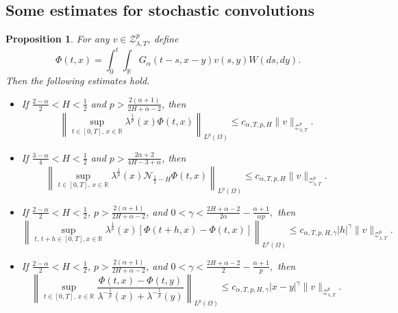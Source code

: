 \documentclass[11pt,reqno]{amsart}
\numberwithin{equation}{section}
\newtheorem{proposition}[theorem]{Proposition}
\newcommand{\1}{{\bf 1}}
\newcommand{\2}{{\bf 2}}
\begin{document}
\subsection{Some estimates for stochastic convolutions}

\begin{proposition}\label{prop 4.2}
For any $v\in \mathcal{Z}_{\lambda,T}^p$, define
\begin{equation}\label{eq stocha1}
\Phi(t,x)=\int_0^t\int_{\mathbb{R}}G_{\alpha}(t-s,x-y)v(s,y)W(ds,dy).
\end{equation}
Then  the following estimates hold.
\begin{itemize}
\item[(i).] If  $\frac{2-\alpha}{2}<H<\frac12$ and $p>\frac{2(\alpha+1)}{2H+\alpha-2}$, then
\begin{equation}\label{eq 4.8}
\left\|\sup_{t\in[0,T],\,x\in\mathbb{R}}\lambda^{\frac1{p}}(x)\Phi(t,x)\right\|_{L^{p}(\Omega)}\le c_{\alpha,T,p,H}\|v\|_{\mathcal{Z}_{\lambda,T}^p}.
\end{equation}
\item[(ii).] If $\frac{3-\alpha}{4}<H<\frac12$ and $p>\frac{2\alpha+2}{4H-3+\alpha}$, then
\begin{equation}\label{eq 4.9}
\left\|\sup_{t\in[0,T],\,x\in\mathbb{R}}\lambda^{\frac1{p}}(x)\mathcal{N}_{\frac12-H}\Phi(t,x)\right\|_{L^{p}(\Omega)}\le c_{\alpha,T,p,H}\|v\|_{\mathcal{Z}_{\lambda,T}^p}.
\end{equation}
\item[(iii).] If  $\frac{2-\alpha}{2}<H<\frac12$, $p>\frac{2(\alpha+1)}{2H+\alpha-2}$, and $0<\gamma<\frac{2H+\alpha-2}{2\alpha}-\frac{\alpha+1}{\alpha p},$ then
\begin{equation}\label{eq 4.10}
\left\|\sup_{t,\, t+h\in[0,T],x\in\mathbb{R}}\lambda^{\frac1{p}}(x)\left[\Phi(t+h,x)-\Phi(t,x)\right]\right\|_{L^{p}(\Omega)}\le c_{\alpha,T,p,H,\gamma}|h|^{\gamma}\|v\|_{\mathcal{Z}_{\lambda,T}^p}.
\end{equation}

 
\item[(iv).] If  $\frac{2-\alpha}{2}<H<\frac12$,  $p>\frac{2(\alpha+1)}{2H+\alpha-2}$, and $0<\gamma<\frac{2H+\alpha-2}{2}-\frac{\alpha+1}{p},$ then
\begin{equation}\label{eq 4.11}
\left\|\sup_{t\in[0,T],\,x\in\mathbb{R}}\frac{\Phi(t,x)-\Phi(t,y)}{\lambda^{-\frac1p}(x)+\lambda^{-\frac1p}(y)}\right\|_{L^{p}(\Omega)}\le c_{\alpha,T,p,H,\gamma}|x-y|^{\gamma}\|v\|_{\mathcal{Z}_{\lambda,T}^p}.
\end{equation}

 \end{itemize}
\end{proposition}
\end{document}
